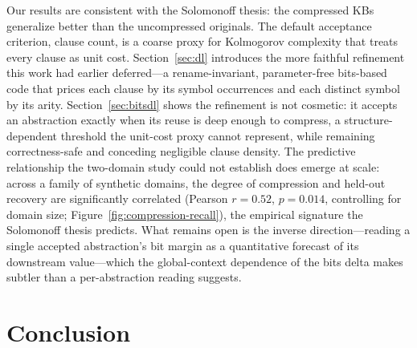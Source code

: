 \documentclass[10pt,conference]{IEEEtran}
\begin{document}
Our results are consistent with the Solomonoff thesis: the compressed KBs generalize better than the uncompressed originals. The default acceptance criterion, clause count, is a coarse proxy for Kolmogorov complexity that treats every clause as unit cost. Section~\ref{sec:dl} introduces the more faithful refinement this work had earlier deferred---a rename-invariant, parameter-free bits-based code that prices each clause by its symbol occurrences and each distinct symbol by its arity. Section~\ref{sec:bitsdl} shows the refinement is not cosmetic: it accepts an abstraction exactly when its reuse is deep enough to compress, a structure-dependent threshold the unit-cost proxy cannot represent, while remaining correctness-safe and conceding negligible clause density. The predictive relationship the two-domain study could not establish does emerge at scale: across a family of synthetic domains, the degree of compression and held-out recovery are significantly correlated (Pearson $r=0.52$, $p=0.014$, controlling for domain size; Figure~\ref{fig:compression-recall}), the empirical signature the Solomonoff thesis predicts. What remains open is the inverse direction---reading a single accepted abstraction's bit margin as a quantitative forecast of its downstream value---which the global-context dependence of the bits delta makes subtler than a per-abstraction reading suggests.


\section{Conclusion}
\label{sec:conclusion}
\end{document}
